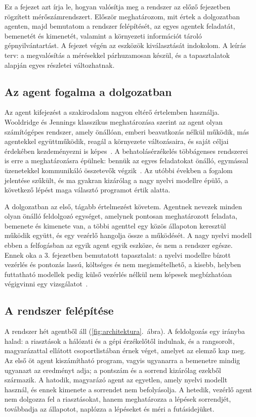 Ez a fejezet azt írja le, hogyan valósítja meg a rendszer az előző fejezetben rögzített mérőszámrendszert. Először meghatározom, mit értek a dolgozatban agenten, majd bemutatom a rendszer felépítését, az egyes agentek feladatát, bemenetét és kimenetét, valamint a környezeti információt tároló gépnyilvántartást. A fejezet végén az eszközök kiválasztását indokolom. A leírás terv: a megvalósítás a mérésekkel párhuzamosan készül, és a tapasztalatok alapján egyes részletei változhatnak.

\subsection{Az agent fogalma a dolgozatban}\label{sec:agent-fogalom}
Az agent kifejezést a szakirodalom nagyon eltérő értelemben használja. Wooldridge és Jennings klasszikus meghatározása szerint az agent olyan számítógépes rendszer, amely önállóan, emberi beavatkozás nélkül működik, más agentekkel együttműködik, reagál a környezete változásaira, és saját céljai érdekében kezdeményezni is képes~\cite{wooldridge1995}. A behatolásérzékelés többágenses rendszerei is erre a meghatározásra épülnek: bennük az egyes feladatokat önálló, egymással üzenetekkel kommunikáló összetevők végzik~\cite{bougueroua2021}. Az utóbbi években a fogalom jelentése szűkült, és ma gyakran kizárólag a nagy nyelvi modellre épülő, a következő lépést maga választó programot értik alatta.

A dolgozatban az első, tágabb értelmezést követem. Agentnek nevezek minden olyan önálló feldolgozó egységet, amelynek pontosan meghatározott feladata, bemenete és kimenete van, a többi agenttel egy közös állapoton keresztül működik együtt, és egy
vezérlő hangolja össze a működését. A nagy nyelvi modell ebben a felfogásban az egyik agent egyik eszköze, és nem a rendszer egésze. Ennek oka a 3. fejezetben bemutatott tapasztalat: a nyelvi modellre bízott vezérlés és pontozás lassú, költséges és nem megismételhető, a kisebb, helyben futtatható modellek pedig külső vezérlés nélkül nem képesek megbízhatóan végigvinni egy vizsgálatot~\cite{liu2026hesp}.

\subsection{A rendszer felépítése}\label{sec:felepites-rendszer}
A rendszer hét agentből áll (\ref{fig:architektura}.~ábra). A feldolgozás egy irányba halad: a riasztások a hálózati és a gépi érzékelőtől indulnak, és a rangsorolt, magyarázattal ellátott csoportlistában érnek véget, amelyet az elemző kap meg. Az első öt agent kiszámítható program, vagyis ugyanarra a bemenetre mindig ugyanazt az eredményt adja; a pontszám és a sorrend kizárólag ezekből származik. A hatodik, magyarázó agent az egyetlen, amely nyelvi modellt használ, és ennek kimenete a sorrendet nem befolyásolja. A hetedik, vezérlő agent nem dolgozza fel a riasztásokat, hanem meghatározza a lépések sorrendjét, továbbadja az állapotot, naplózza a lépéseket és méri a futásidejüket.


